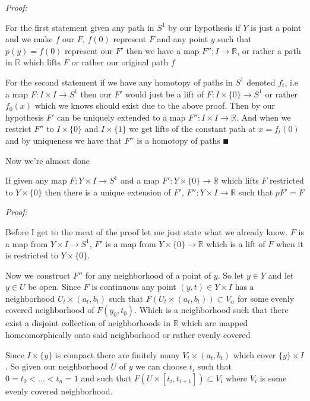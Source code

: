 \documentclass[paper=a4,fontsize=paper,12.5pt]{book}
\newcommand{\3}{\vspace*{3mm}}
\newcommand{\Proof}{\textit{Proof:}}
\newcommand{\R}{\mathbb{R}}
\newcommand{\C}[1]{{S}^{#1}}
\begin{document}
\Proof 

For the first statement given any path in $\C{1}$ by our hypothesis if $Y$ is just a point and we make $f$ our $F$, $f(0)$ represent $F$ and any point $y$ such that $p(y) = f(0)$ represent our $F'$ then we have a map $F'':I \to \R$, or rather a path in $\R$ which lifts $F$ or rather our original path $f$

\3

For the second statement if we have any homotopy of paths in $\C{1}$ denoted ${f}_{t}$, i.e a map $F: I \times I \to \C{1}$ then our $F'$ would just be a lift of $F:I \times \{0\} \to \C{1}$ or rather ${f}_{0}(x)$ which we knows should exist due to the above proof. Then by our hypothesis $F'$ can be uniquely extended to a map $F'': I \times I \to \R$. And when we restrict $F''$ to $I \times \{0\}$ and $I \times \{1\}$ we get lifts of the constant path at ${x} = {f}_{t}(0)$ and by uniqueness we have that $F''$ is a homotopy of paths $\QED$



Now we're almost done 
\newpage

\begin{theorem}

If given any map $F: Y \times I \to \C{1}$ and a map $F': Y \times \{0\} \to \R$ which lifts $F$ restricted to $Y \times \{0\}$ then there is a unique extension of $F'$, $F'': Y \times I \to \R$ such that  $pF' = F$

\end{theorem}

\Proof

Before I get to the meat of the proof let me just state what we already know. $F$ is a map from $Y \times I \to \C{1}$, $F'$ is a map from $Y \times \{0\} \to \R$ which is a lift of $F$ when it is restricted to $Y \times \{0\}$. 

\3

Now we construct $F''$ for any neighborhood of a point of $y$. So let $y \in Y$ and let $ y \in U$ be open. Since $F$ is continuous any point $(y,t) \in Y \times I$ has a neighborhood ${U}_{t} \times ({a}_{t},{b}_{t})$ such that $F({U}_{t} \times ({a}_{t},{b}_{t})) \subset {V}_{\alpha}$ for some evenly covered neighborhood of $F({y}_{0},{t}_{0})$. Which is a neighborhood such that there exist a disjoint collection of neighborhoods in $\R$ which are mapped homeomorphically onto said neighborhood or rather evenly covered

\3

Since $I \times \{y\}$ is compact there are finitely many ${V}_{t} \times ({a}_{t},{b}_{t})$ which cover $\{y\} \times I$. So given our neighborhood $U$ of $y$ we can choose ${t}_{i}$ such that $0 = {t}_{0} < ... < {t}_{n} = 1$ and such that $F(U \times [{t}_{i},{t}_{i+1}]) \subset {V}_{i}$ where ${V}_{i}$ is some evenly covered neighborhood. 
\end{document}
